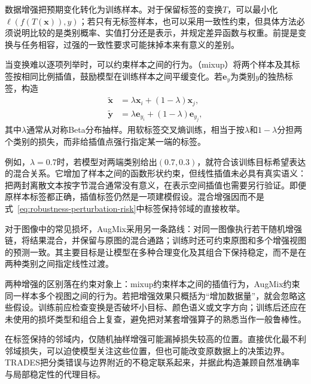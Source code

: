 数据增强把预期变化转化为训练样本。对于保留标签的变换$T$，可以最小化$\ell(f(T(\bm{x})),y)$；若只有无标签样本，也可以采用一致性约束，但具体方法必须说明比较的是类别概率、实值打分还是表示，并规定差异函数与权重。前提是变换与任务相容，过强的一致性要求可能抹掉本来有意义的差别。

当变换难以逐项列举时，可以约束样本之间的行为。（mixup）将两个样本及其标签按相同比例插值，鼓励模型在训练样本之间平缓变化。若$\bm{e}_{y}$为类别$y$的独热标签，构造
\begin{equation}
 \begin{aligned}
  \widetilde{\bm{x}}&=\lambda\bm{x}_i+(1-\lambda)\bm{x}_j,\\
  \widetilde{\bm{y}}&=\lambda\bm{e}_{y_i}
                         +(1-\lambda)\bm{e}_{y_j},
 \end{aligned}
 \label{eq:robustness-mixup}
\end{equation}
其中$\lambda$通常从对称Beta分布抽样。用软标签交叉熵训练，相当于按$\lambda$和$1-\lambda$分担两个类别的损失，而非给插值点强行指定某一端的标签。

例如，$\lambda=0.7$时，若模型对两端类别给出$(0.7,0.3)$，就符合该训练目标希望表达的混合关系。它增加了样本之间的函数形状约束，但线性插值未必具有真实语义：把两封离散文本按字节混合通常没有意义，在表示空间插值也需要另行验证。即便原样本标签都正确，插值标签仍然是一项建模假设。混合增强因而不是式~\eqref{eq:robustness-perturbation-risk}中标签保持邻域的直接枚举。

对于图像中的常见损坏，AugMix采用另一条路线：对同一图像执行若干随机增强链，将结果混合，并保留与原图的混合通路；训练时还可约束原图和多个增强视图的预测一致。其主要目标是让模型在多种合理变化及其组合下保持稳定，而不是在两种类别之间指定线性过渡。

两种增强的区别落在约束对象上：mixup约束样本之间的插值行为，AugMix约束同一样本多个视图之间的行为。若把增强效果只概括为“增加数据量”，就会忽略这些假设。训练前应检查变换是否破坏小目标、颜色语义或文字方向；训练后还应在未使用的损坏类型和组合上复查，避免把对某套增强算子的熟悉当作一般鲁棒性。

在标签保持的邻域内，仅随机抽样增强可能漏掉损失较高的位置。直接优化最不利邻域损失，可以迫使模型关注这些位置，但也可能改变原数据上的决策边界。TRADES把分类错误与边界附近的不稳定联系起来，并据此构造兼顾自然准确率与局部稳定性的代理目标。


